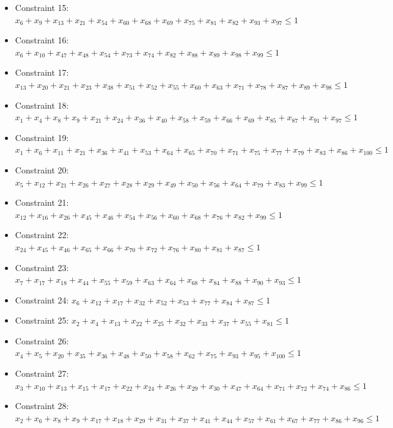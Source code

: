 \documentclass[11pt]{article}
\begin{document}
\begin{itemize}
\item Constraint 15: $x_{6} + x_{9} + x_{13} + x_{21} + x_{54} + x_{60} + x_{68} + x_{69} + x_{75} + x_{81} + x_{82} + x_{93} + x_{97} \le 1$
\item Constraint 16: $x_{6} + x_{10} + x_{47} + x_{48} + x_{54} + x_{73} + x_{74} + x_{82} + x_{88} + x_{89} + x_{98} + x_{99} \le 1$
\item Constraint 17: $x_{13} + x_{20} + x_{21} + x_{23} + x_{38} + x_{51} + x_{52} + x_{55} + x_{60} + x_{63} + x_{71} + x_{78} + x_{87} + x_{89} + x_{98} \le 1$
\item Constraint 18: $x_{1} + x_{4} + x_{8} + x_{9} + x_{21} + x_{24} + x_{36} + x_{40} + x_{58} + x_{59} + x_{66} + x_{69} + x_{85} + x_{87} + x_{91} + x_{97} \le 1$
\item Constraint 19: $x_{1} + x_{6} + x_{11} + x_{21} + x_{36} + x_{41} + x_{53} + x_{64} + x_{65} + x_{70} + x_{71} + x_{75} + x_{77} + x_{79} + x_{83} + x_{86} + x_{100} \le 1$
\item Constraint 20: $x_{5} + x_{12} + x_{21} + x_{26} + x_{27} + x_{28} + x_{29} + x_{49} + x_{50} + x_{56} + x_{64} + x_{79} + x_{83} + x_{99} \le 1$
\item Constraint 21: $x_{12} + x_{16} + x_{26} + x_{45} + x_{46} + x_{54} + x_{56} + x_{60} + x_{68} + x_{76} + x_{82} + x_{99} \le 1$
\item Constraint 22: $x_{24} + x_{45} + x_{46} + x_{65} + x_{66} + x_{70} + x_{72} + x_{76} + x_{80} + x_{81} + x_{87} \le 1$
\item Constraint 23: $x_{7} + x_{17} + x_{18} + x_{44} + x_{55} + x_{59} + x_{63} + x_{64} + x_{68} + x_{84} + x_{88} + x_{90} + x_{93} \le 1$
\item Constraint 24: $x_{6} + x_{12} + x_{17} + x_{32} + x_{52} + x_{53} + x_{77} + x_{84} + x_{87} \le 1$
\item Constraint 25: $x_{2} + x_{4} + x_{13} + x_{22} + x_{25} + x_{32} + x_{33} + x_{37} + x_{55} + x_{81} \le 1$
\item Constraint 26: $x_{4} + x_{5} + x_{20} + x_{35} + x_{36} + x_{48} + x_{50} + x_{58} + x_{62} + x_{75} + x_{93} + x_{95} + x_{100} \le 1$
\item Constraint 27: $x_{3} + x_{10} + x_{13} + x_{15} + x_{17} + x_{22} + x_{24} + x_{26} + x_{29} + x_{30} + x_{47} + x_{64} + x_{71} + x_{72} + x_{74} + x_{86} \le 1$
\item Constraint 28: $x_{2} + x_{6} + x_{8} + x_{9} + x_{17} + x_{18} + x_{29} + x_{31} + x_{37} + x_{41} + x_{44} + x_{57} + x_{61} + x_{67} + x_{77} + x_{86} + x_{96} \le 1$

\end{itemize}
\end{document}
